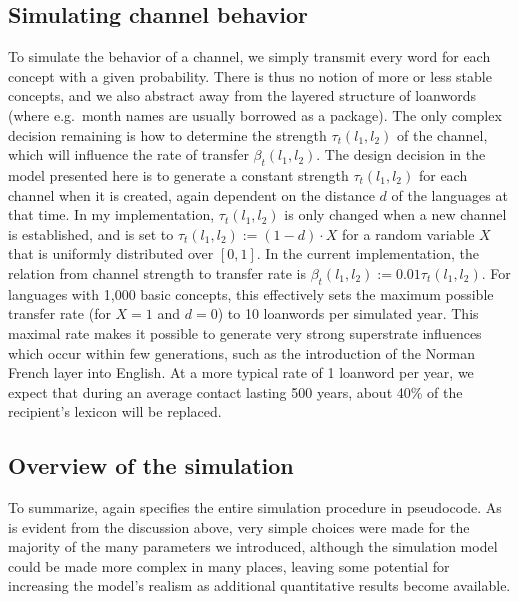 \subsection{Simulating channel behavior}
To simulate the behavior of a channel, we simply transmit every word for each concept with a given probability. There is thus no notion of more or less stable concepts, and we also abstract away from the layered structure of loanwords (where e.g.\ month names are usually borrowed as a package). The only complex decision remaining is how to determine the strength $\tau_t(l_1,l_2)$ of the channel, which will influence the rate of transfer $\beta_t(l_1,l_2)$. The design decision in the model presented here is to generate a constant strength $\tau_t(l_1,l_2)$ for each channel when it is created, again dependent on the distance $d$ of the languages at that time. In my implementation, $\tau_t(l_1,l_2)$ is only changed when a new channel is established, and is set to $\tau_t(l_1,l_2) := (1 - d) \cdot X$ for a random variable $X$ that is uniformly distributed over $[0,1]$. In the current implementation, the relation from channel strength to transfer rate is $\beta_t(l_1,l_2) := 0.01\tau_t(l_1,l_2)$. For languages with 1,000 basic concepts, this effectively sets the maximum possible transfer rate (for $X = 1$ and $d = 0$) to 10 loanwords per simulated year. This maximal rate makes it possible to generate very strong superstrate influences which occur within few generations, such as the introduction of the Norman French layer into English. At a more typical rate of 1 loanword per year, we expect that during an average contact lasting 500 years, about 40\% of the recipient's lexicon will be replaced.

\subsection{Overview of the simulation}
To summarize,  again specifies the entire simulation procedure in pseudocode. As is evident from the discussion above, very simple choices were made for the majority of the many parameters we introduced, although the simulation model could be made more complex in many places, leaving some potential for increasing the model's realism as additional quantitative results become available.

